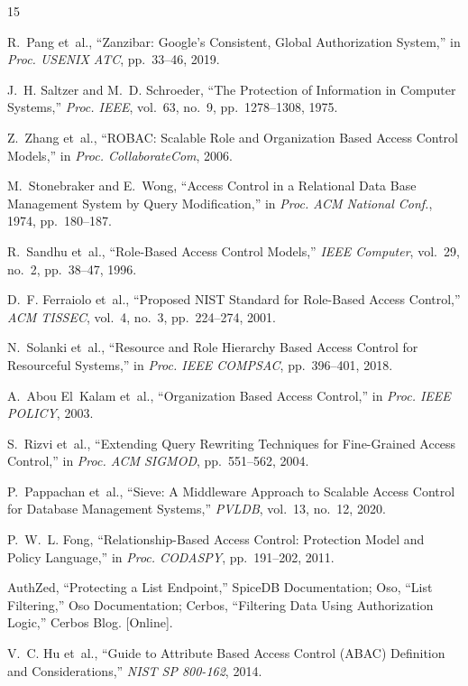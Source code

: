 \documentclass[conference]{IEEEtran}
\begin{document}
\balance
\begin{thebibliography}{15}

R.~Pang et~al., ``Zanzibar: Google's Consistent, Global Authorization System,'' in \emph{Proc. USENIX ATC}, pp.~33--46, 2019.

J.~H. Saltzer and M.~D. Schroeder, ``The Protection of Information in Computer Systems,'' \emph{Proc. IEEE}, vol.~63, no.~9, pp.~1278--1308, 1975.

Z.~Zhang et~al., ``ROBAC: Scalable Role and Organization Based Access Control Models,'' in \emph{Proc. CollaborateCom}, 2006.

M.~Stonebraker and E.~Wong, ``Access Control in a Relational Data Base Management System by Query Modification,'' in \emph{Proc. ACM National Conf.}, 1974, pp.~180--187.

R.~Sandhu et~al., ``Role-Based Access Control Models,'' \emph{IEEE Computer}, vol.~29, no.~2, pp.~38--47, 1996.

D.~F. Ferraiolo et~al., ``Proposed NIST Standard for Role-Based Access Control,'' \emph{ACM TISSEC}, vol.~4, no.~3, pp.~224--274, 2001.

N.~Solanki et~al., ``Resource and Role Hierarchy Based Access Control for Resourceful Systems,'' in \emph{Proc. IEEE COMPSAC}, pp.~396--401, 2018.

A.~Abou El~Kalam et~al., ``Organization Based Access Control,'' in \emph{Proc. IEEE POLICY}, 2003.

S.~Rizvi et~al., ``Extending Query Rewriting Techniques for Fine-Grained Access Control,'' in \emph{Proc. ACM SIGMOD}, pp.~551--562, 2004.

P.~Pappachan et~al., ``Sieve: A Middleware Approach to Scalable Access Control for Database Management Systems,'' \emph{PVLDB}, vol.~13, no.~12, 2020.

P.~W.~L. Fong, ``Relationship-Based Access Control: Protection Model and Policy Language,'' in \emph{Proc. CODASPY}, pp.~191--202, 2011.

AuthZed, ``Protecting a List Endpoint,'' SpiceDB Documentation; Oso, ``List Filtering,'' Oso Documentation; Cerbos, ``Filtering Data Using Authorization Logic,'' Cerbos Blog. [Online].

V.~C. Hu et~al., ``Guide to Attribute Based Access Control (ABAC) Definition and Considerations,'' \emph{NIST SP 800-162}, 2014.

\end{thebibliography}
\end{document}
